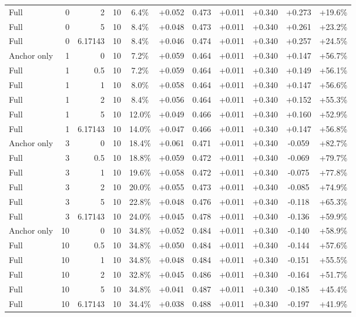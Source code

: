\begin{table}[htbp]
\begin{tabular}{lrrrccccccc}
Full & 0 & 2 & 10 & 6.4\% & +0.052 & 0.473 & +0.011 & +0.340 & +0.273 & +19.6\% \\
Full & 0 & 5 & 10 & 8.4\% & +0.048 & 0.473 & +0.011 & +0.340 & +0.261 & +23.2\% \\
Full & 0 & 6.17143 & 10 & 8.4\% & +0.046 & 0.474 & +0.011 & +0.340 & +0.257 & +24.5\% \\
Anchor only & 1 & 0 & 10 & 7.2\% & +0.059 & 0.464 & +0.011 & +0.340 & +0.147 & +56.7\% \\
Full & 1 & 0.5 & 10 & 7.2\% & +0.059 & 0.464 & +0.011 & +0.340 & +0.149 & +56.1\% \\
Full & 1 & 1 & 10 & 8.0\% & +0.058 & 0.464 & +0.011 & +0.340 & +0.147 & +56.6\% \\
Full & 1 & 2 & 10 & 8.4\% & +0.056 & 0.464 & +0.011 & +0.340 & +0.152 & +55.3\% \\
Full & 1 & 5 & 10 & 12.0\% & +0.049 & 0.466 & +0.011 & +0.340 & +0.160 & +52.9\% \\
Full & 1 & 6.17143 & 10 & 14.0\% & +0.047 & 0.466 & +0.011 & +0.340 & +0.147 & +56.8\% \\
Anchor only & 3 & 0 & 10 & 18.4\% & +0.061 & 0.471 & +0.011 & +0.340 & -0.059 & +82.7\% \\
Full & 3 & 0.5 & 10 & 18.8\% & +0.059 & 0.472 & +0.011 & +0.340 & -0.069 & +79.7\% \\
Full & 3 & 1 & 10 & 19.6\% & +0.058 & 0.472 & +0.011 & +0.340 & -0.075 & +77.8\% \\
Full & 3 & 2 & 10 & 20.0\% & +0.055 & 0.473 & +0.011 & +0.340 & -0.085 & +74.9\% \\
Full & 3 & 5 & 10 & 22.8\% & +0.048 & 0.476 & +0.011 & +0.340 & -0.118 & +65.3\% \\
Full & 3 & 6.17143 & 10 & 24.0\% & +0.045 & 0.478 & +0.011 & +0.340 & -0.136 & +59.9\% \\
Anchor only & 10 & 0 & 10 & 34.8\% & +0.052 & 0.484 & +0.011 & +0.340 & -0.140 & +58.9\% \\
Full & 10 & 0.5 & 10 & 34.8\% & +0.050 & 0.484 & +0.011 & +0.340 & -0.144 & +57.6\% \\
Full & 10 & 1 & 10 & 34.8\% & +0.048 & 0.484 & +0.011 & +0.340 & -0.151 & +55.5\% \\
Full & 10 & 2 & 10 & 32.8\% & +0.045 & 0.486 & +0.011 & +0.340 & -0.164 & +51.7\% \\
Full & 10 & 5 & 10 & 34.8\% & +0.041 & 0.487 & +0.011 & +0.340 & -0.185 & +45.4\% \\
Full & 10 & 6.17143 & 10 & 34.4\% & +0.038 & 0.488 & +0.011 & +0.340 & -0.197 & +41.9\% \\

\end{tabular}
\end{table}

